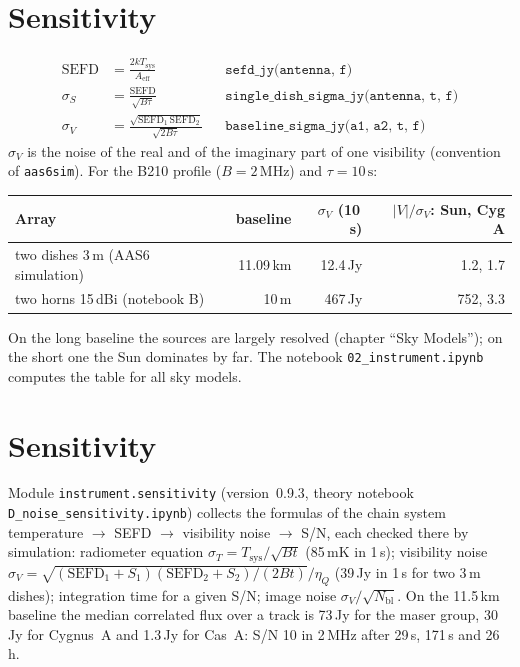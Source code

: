 \section{Sensitivity}

\begin{align}
  \mathrm{SEFD} &= \frac{2kT_\mathrm{sys}}{A_\mathrm{eff}}
     && \texttt{sefd\_jy(antenna, f)}\\
  \sigma_S &= \frac{\mathrm{SEFD}}{\sqrt{B\tau}}
     && \texttt{single\_dish\_sigma\_jy(antenna, t, f)}\\
  \sigma_V &= \frac{\sqrt{\mathrm{SEFD}_1\,\mathrm{SEFD}_2}}{\sqrt{2B\tau}}
     && \texttt{baseline\_sigma\_jy(a1, a2, t, f)}
\end{align}
$\sigma_V$ is the noise of the real and of the imaginary part of one
visibility (convention of \texttt{aas6sim}). For the B210 profile
($B = 2\,\mathrm{MHz}$) and $\tau = 10\,\mathrm{s}$:
\begin{center}
\begin{tabular}{@{}lrrr@{}}
\toprule
Array & baseline & $\sigma_V$ (10\,s) & $|V|/\sigma_V$: Sun, Cyg A \\
\midrule
two dishes 3\,m (AAS6 simulation) & 11.09\,km & 12.4\,Jy & 1.2, 1.7 \\
two horns 15\,dBi (notebook B) & 10\,m & 467\,Jy & 752, 3.3 \\
\bottomrule
\end{tabular}
\end{center}
On the long baseline the sources are largely resolved (chapter
\enquote{Sky Models}); on the short one the Sun dominates by far. The
notebook \texttt{02\_instrument.ipynb} computes the table for all
sky models.

\section{Sensitivity}
\label{sec:sensitivity}

Module \texttt{instrument.sensitivity} (version~0.9.3, theory notebook
\texttt{D\_noise\_sensitivity.ipynb}) collects the formulas of the chain
system temperature $\to$ SEFD $\to$ visibility noise $\to$ S/N, each checked
there by simulation:
radiometer equation $\sigma_T = T_\mathrm{sys}/\sqrt{Bt}$ (85\,mK in 1\,s);
visibility noise $\sigma_V = \sqrt{(\mathrm{SEFD}_1+S_1)(\mathrm{SEFD}_2+S_2)/(2Bt)}/\eta_Q$
(39\,Jy in 1\,s for two 3\,m dishes); integration time for a given S/N;
image noise $\sigma_V/\sqrt{N_\mathrm{bl}}$. On the 11.5\,km baseline the
median correlated flux over a track is 73\,Jy for the maser group, 30\,Jy for
Cygnus~A and 1.3\,Jy for Cas~A: S/N 10 in 2\,MHz after 29\,s, 171\,s and 26\,h.

